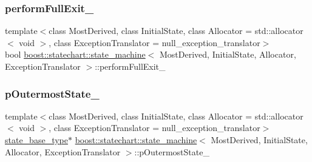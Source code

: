 \mbox{\label{classboost_1_1statechart_1_1state__machine_a9ae64cb7ef7369c8a29cf86fb8a6daf9}} 
\subsubsection{\texorpdfstring{perform\+Full\+Exit\+\_\+}{performFullExit\_}}
{\footnotesize\ttfamily template$<$class Most\+Derived, class Initial\+State, class Allocator = std\+::allocator$<$ void $>$, class Exception\+Translator = null\+\_\+exception\+\_\+translator$>$ \\
bool \mbox{\hyperlink{classboost_1_1statechart_1_1state__machine}{boost\+::statechart\+::state\+\_\+machine}}$<$ Most\+Derived, Initial\+State, Allocator, Exception\+Translator $>$\+::perform\+Full\+Exit\+\_\+\hspace{0.3cm}{\ttfamily [private]}}

\mbox{\label{classboost_1_1statechart_1_1state__machine_a00e489e60fee093aea3de451e0f32358}} 
\subsubsection{\texorpdfstring{p\+Outermost\+State\+\_\+}{pOutermostState\_}}
{\footnotesize\ttfamily template$<$class Most\+Derived, class Initial\+State, class Allocator = std\+::allocator$<$ void $>$, class Exception\+Translator = null\+\_\+exception\+\_\+translator$>$ \\
\mbox{\hyperlink{classboost_1_1statechart_1_1state__machine_a69cc258c29fcabec25c5dc8bedb7d530}{state\+\_\+base\+\_\+type}}$\ast$ \mbox{\hyperlink{classboost_1_1statechart_1_1state__machine}{boost\+::statechart\+::state\+\_\+machine}}$<$ Most\+Derived, Initial\+State, Allocator, Exception\+Translator $>$\+::p\+Outermost\+State\+\_\+\hspace{0.3cm}{\ttfamily [private]}}

